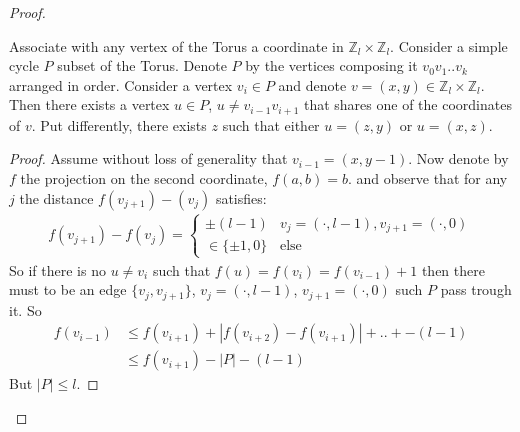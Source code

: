 \documentclass[12pt,a4paper]{article}
\begin{document}
\begin{proof}
  \begin{claim}
    \label{claim:inter}
Associate with any vertex of the Torus a coordinate in $\mathbb{Z}_{l} \times \mathbb{Z}_{l}$. Consider a simple cycle $P$ subset of the Torus. Denote $P$ by the vertices composing it $v_{0}v_{1}..v_{k}$ arranged in order. Consider a vertex $v_{i} \in P$  and denote $v = \left( x,y \right) \in $$ \mathbb{Z}_{l} \times \mathbb{Z}_{l}$. Then there exists a vertex $u \in P$, $ u \neq v_{i-1}v_{i+1}$ that shares one of the coordinates of $v$. Put differently, there exists $z$ such that either  $u = \left( z,y \right)$ or $u = \left( x,z \right)$.
  \end{claim}

  \begin{proof} 
Assume without loss of generality that $v_{i-1} = \left( x, y -1 \right)$. Now denote by $f$ the projection on the second coordinate, $f(a,b)= b$. and observe that for any $j$ the distance $f\left( v_{j+1}\right) - \left( v_{j}  \right)$ satisfies:
    \begin{equation*}
      \begin{split}
      f\left( v_{j+1}\right) - f \left( v_{j}  \right) = 
        \begin{cases}
          \pm \left( l - 1 \right)  & v_{j} = \left( \cdot, l -1 \right), v_{j+1} = \left( \cdot, 0  \right)  \\
          \in \{ \pm 1 , 0\} & \text{else}
        \end{cases}
      \end{split}
    \end{equation*}
    So if there is no $u \neq v_{i}$ such that $f(u) = f(v_{i}) = f(v_{i-1})+1$ then there must to be an edge $\{v_{j},v_{j+1}\}$, $v_{j} = \left( \cdot, l -1 \right)$, $ v_{j+1} = \left( \cdot, 0  \right)$ such $P$ pass trough it. So  
    \begin{equation*}
      \begin{split}
        f\left( v_{i-1} \right) & \le f\left( v_{i+1} \right) +  |f\left( v_{i+2} \right) -  f\left( v_{i+1} \right)| + .. + -\left( l - 1 \right) \\ 
        & \le f(v_{i+1}) - |P| - \left(l-1\right)  
      \end{split}
    \end{equation*}
    But $|P| \le l$. 
  \end{proof}
  \begin{figure}[h]
\end{figure}
\end{proof}
\end{document}
